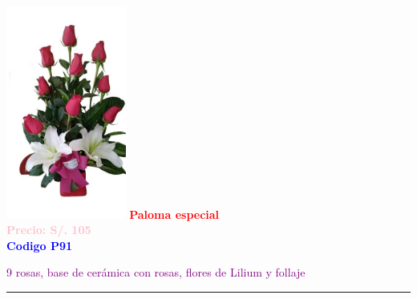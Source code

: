\begin{multicols}{2}
    \begin{minipage}{\linewidth}
        \centering
        \includegraphics[height=7cm]{imagenes_extraidas/image_9_5} %
        \newline
        \vspace{0.1cm}
        \textbf{\Large \textcolor{red}{Paloma especial}} \\ %
        \vspace{0.2cm}
        \textbf{\textcolor{pink}{Precio: S/. 105}} \\ %
        \vspace{0.2cm}
        \textbf{\textcolor{blue}{Codigo P91}} \\ %
        \vspace{0.2cm}
        \begin{minipage}{0.8\linewidth} 
            \small \textcolor{purple}{9 rosas, base de cerámica con rosas, flores de Lilium y follaje} %
        \end{minipage}
        \vspace{0.1cm}        
        \rule{\linewidth}{0.5pt}
    \end{minipage}
    \end{multicols}
\newpage

